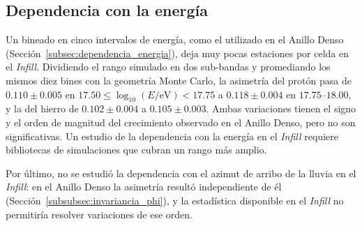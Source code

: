 \subsection{Dependencia con la energía}

Un bineado en cinco intervalos de energía, como el utilizado en el Anillo Denso (Sección~\ref{subsec:dependencia_energia}), deja muy pocas estaciones por celda en el \textit{Infill}. Dividiendo el rango simulado en dos sub-bandas y promediando los mismos diez bines con la geometría Monte Carlo, la asimetría del protón pasa de $0.110 \pm 0.005$ en $17.50 \leq \log_{10}(E/\mathrm{eV}) < 17.75$ a $0.118 \pm 0.004$ en $17.75$--$18.00$, y la del hierro de $0.102 \pm 0.004$ a $0.105 \pm 0.003$. Ambas variaciones tienen el signo y el orden de magnitud del crecimiento observado en el Anillo Denso, pero no son significativas. Un estudio de la dependencia con la energía en el \textit{Infill} requiere bibliotecas de simulaciones que cubran un rango más amplio.

Por último, no se estudió la dependencia con el azimut de arribo de la lluvia en el \textit{Infill}: en el Anillo Denso la asimetría resultó independiente de él (Sección~\ref{subsubsec:invariancia_phi}), y la estadística disponible en el \textit{Infill} no permitiría resolver variaciones de ese orden.


\newpage
